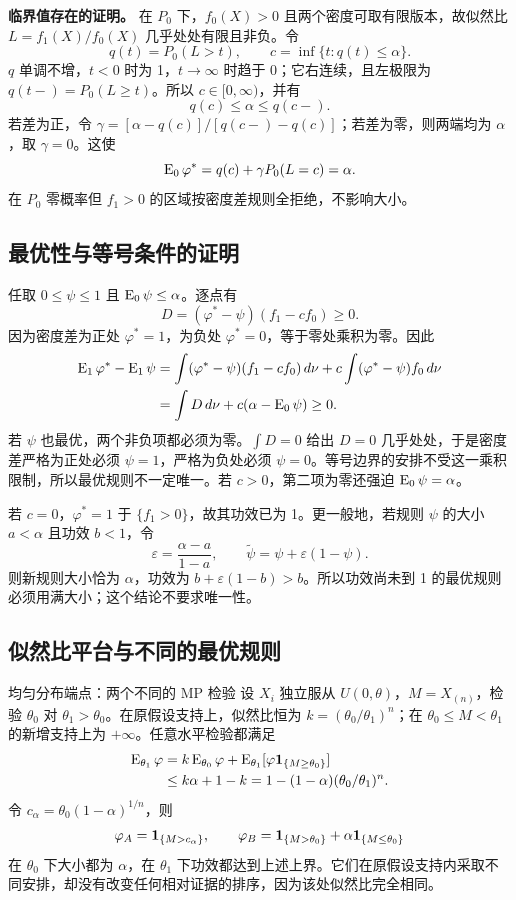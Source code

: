 \textbf{临界值存在的证明。}
在 $P_0$ 下，$f_0(X)>0$ 且两个密度可取有限版本，故似然比 $L=f_1(X)/f_0(X)$ 几乎处处有限且非负。令
\[
 q(t)=P_0(L>t),\qquad
 c=\inf\{t:q(t)\le\alpha\}.
\]
$q$ 单调不增，$t<0$ 时为 1，$t\to\infty$ 时趋于 0；它右连续，且左极限为 $q(t-)=P_0(L\ge t)$。所以 $c\in[0,\infty)$，并有
\[
 q(c)\le\alpha\le q(c-).
\]
若差为正，令 $\gamma=[\alpha-q(c)]/[q(c-)-q(c)]$；若差为零，则两端均为 $\alpha$，取 $\gamma=0$。这使
\[
 \operatorname{E}_0\varphi^*=q(c)+\gamma P_0(L=c)=\alpha.
\]
在 $P_0$ 零概率但 $f_1>0$ 的区域按密度差规则全拒绝，不影响大小。

\subsection{最优性与等号条件的证明}

任取 $0\le\psi\le1$ 且 $\operatorname{E}_0\psi\le\alpha$。逐点有
\[
 D=(\varphi^*-\psi)(f_1-cf_0)\ge0.
\]
因为密度差为正处 $\varphi^*=1$，为负处 $\varphi^*=0$，等于零处乘积为零。因此
\begin{align*}
 \operatorname{E}_1\varphi^*-\operatorname{E}_1\psi
 &=\int(\varphi^*-\psi)(f_1-cf_0)\,d\nu
        +c\int(\varphi^*-\psi)f_0\,d\nu\\
 &=\int D\,d\nu+c(\alpha-\operatorname{E}_0\psi)\ge0.
\end{align*}
若 $\psi$ 也最优，两个非负项都必须为零。$\int D=0$ 给出 $D=0$ 几乎处处，于是密度差严格为正处必须 $\psi=1$，严格为负处必须 $\psi=0$。等号边界的安排不受这一乘积限制，所以最优规则不一定唯一。若 $c>0$，第二项为零还强迫 $\operatorname{E}_0\psi=\alpha$。

若 $c=0$，$\varphi^*=1$ 于 $\{f_1>0\}$，故其功效已为 1。更一般地，若规则 $\psi$ 的大小 $a<\alpha$ 且功效 $b<1$，令
\[
 \varepsilon=\frac{\alpha-a}{1-a},\qquad
 \widetilde\psi=\psi+\varepsilon(1-\psi).
\]
则新规则大小恰为 $\alpha$，功效为 $b+\varepsilon(1-b)>b$。所以功效尚未到 1 的最优规则必须用满大小；这个结论不要求唯一性。

\subsection{似然比平台与不同的最优规则}

\begin{examplebox}{均匀分布端点：两个不同的 MP 检验}
设 $X_i$ 独立服从 $U(0,\theta)$，$M=X_{(n)}$，检验 $\theta_0$ 对 $\theta_1>\theta_0$。在原假设支持上，似然比恒为
$k=(\theta_0/\theta_1)^n$；在 $\theta_0\le M<\theta_1$ 的新增支持上为 $+\infty$。任意水平检验都满足
\begin{align*}
 \operatorname{E}_{\theta_1}\varphi
 &=k\operatorname{E}_{\theta_0}\varphi
   +\operatorname{E}_{\theta_1}[\varphi\mathbf 1_{\{M\ge\theta_0\}}]\\
 &\le k\alpha+1-k
 =1-(1-\alpha)(\theta_0/\theta_1)^n.
\end{align*}
令 $c_\alpha=\theta_0(1-\alpha)^{1/n}$，则
\[
 \varphi_A=\mathbf 1_{\{M>c_\alpha\}},\qquad
 \varphi_B=\mathbf 1_{\{M>\theta_0\}}+
              \alpha\mathbf 1_{\{M\le\theta_0\}}
\]
在 $\theta_0$ 下大小都为 $\alpha$，在 $\theta_1$ 下功效都达到上述上界。它们在原假设支持内采取不同安排，却没有改变任何相对证据的排序，因为该处似然比完全相同。
\end{examplebox}


